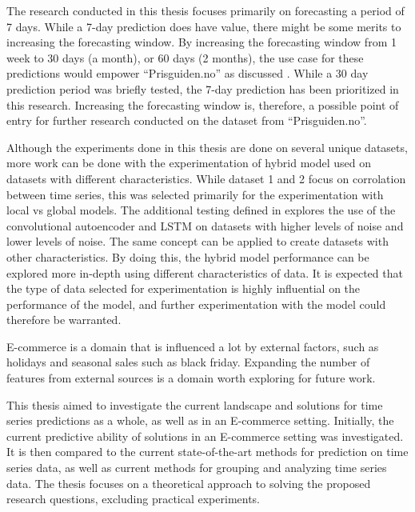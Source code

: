 The research conducted in this thesis focuses primarily on forecasting a period of 7 days.
While a 7-day prediction does have value,
there might be some merits to increasing the forecasting window.
By increasing the forecasting window from 1 week to 30 days (a month), or 60 days (2 months),
the use case for these predictions would empower ``Prisguiden.no'' as discussed .
While a 30 day prediction period was briefly tested,
the 7-day prediction has been prioritized in this research.
Increasing the forecasting window is, therefore, a possible point of entry for further research conducted on the
dataset from ``Prisguiden.no''.


Although the experiments done in this thesis are done on several unique datasets,
more work can be done with the experimentation of hybrid model used on datasets with different characteristics.
While dataset 1 and 2 focus on corrolation between time series, this was selected primarily for the experimentation with local vs global models.
The additional testing defined in  explores the use of the convolutional autoencoder and LSTM
on datasets with higher levels of noise and lower levels of noise.
The same concept can be applied to create datasets with other characteristics.
By doing this, the hybrid model performance can be explored more in-depth using different characteristics of data.
It is expected that the type of data selected for experimentation is highly influential on the performance of the model,
and further experimentation with the model could therefore be warranted.

E-commerce is a domain that is influenced a lot by external factors, such as holidays and seasonal sales such as black friday.
Expanding the number of features from external sources is a domain worth exploring for future work.



\iffalse
  This thesis aimed to investigate the current landscape and solutions for time series predictions as a whole,
  as well as in an E-commerce setting.
  Initially, the current predictive ability of solutions in an E-commerce setting was investigated.
  It is then compared to the current state-of-the-art methods for prediction on time series data,
  as well as current methods for grouping and analyzing time series data.
  The thesis focuses on a theoretical approach to solving the proposed research questions,
  excluding practical experiments.

